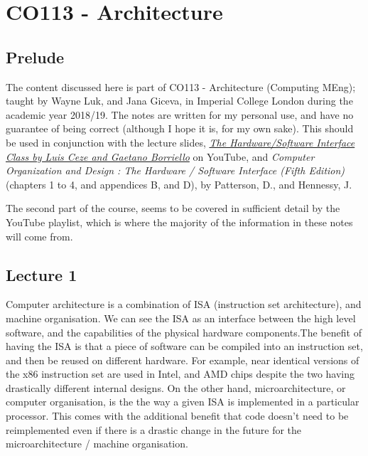 \documentclass[a4paper, 12pt]{article}
\begin{document}
    \section*{CO113 - Architecture}
        \subsection*{Prelude}
            The content discussed here is part of CO113 - Architecture (Computing MEng); taught by Wayne Luk, and Jana Giceva, in Imperial College London during the academic year 2018/19. The notes are written for my personal use, and have no guarantee of being correct (although I hope it is, for my own sake). This should be used in conjunction with the lecture slides, \href{https://www.youtube.com/playlist?list=PL0oekSefhQVJdk0hSRu6sZ2teWM740NtL}{\textit{The Hardware/Software Interface Class by Luis Ceze and Gaetano Borriello}} on YouTube, and \textit{Computer Organization and Design : The Hardware / Software Interface (Fifth Edition)} (chapters 1 to 4, and appendices B, and D), by Patterson, D., and Hennessy, J.
            \medskip

            The second part of the course, seems to be covered in sufficient detail by the YouTube playlist, which is where the majority of the information in these notes will come from.
        \subsection*{Lecture 1}
            Computer architecture is a combination of ISA (instruction set architecture), and machine organisation. We can see the ISA as an interface between the high level software, and the capabilities of the physical hardware components.The benefit of having the ISA is that a piece of software can be compiled into an instruction set, and then be reused on different hardware. For example, near identical versions of the x86 instruction set are used in Intel, and AMD chips despite the two having drastically different internal designs. On the other hand, microarchitecture, or computer organisation, is the the way a given ISA is implemented in a particular processor. This comes with the additional benefit that code doesn't need to be reimplemented even if there is a drastic change in the future for the microarchitecture / machine organisation.
            \medskip
\end{document}
